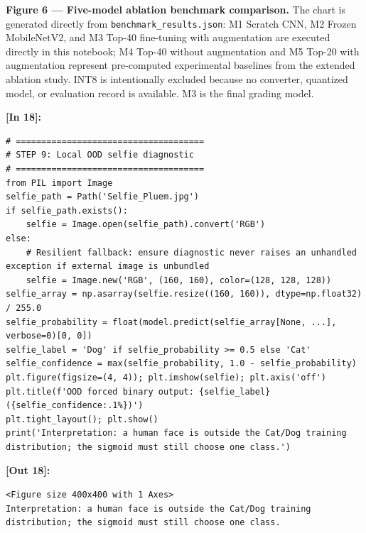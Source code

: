 \vspace{-0.3em}
\begin{tcolorbox}[colback=gray!5!white,colframe=gray!50!black,boxrule=0.5pt,arc=2pt,left=6pt,right=6pt,halign=left,before upper={\sloppy\raggedright},top=4pt,bottom=4pt,unbreakable]
\textbf{Figure 6 — Five-model ablation benchmark comparison.} The chart is generated directly from \texttt{benchmark\_results.json}: M1 Scratch CNN, M2 Frozen MobileNetV2, and M3 Top-40 fine-tuning with augmentation are executed directly in this notebook; M4 Top-40 without augmentation and M5 Top-20 with augmentation represent pre-computed experimental baselines from the extended ablation study. INT8 is intentionally excluded because no converter, quantized model, or evaluation record is available. M3 is the final grading model.
\end{tcolorbox}

\vspace{0.6em}
\noindent\textbf{\small [In 18]:}
\begin{lstlisting}[style=pycode]
# =====================================
# STEP 9: Local OOD selfie diagnostic
# =====================================
from PIL import Image
selfie_path = Path('Selfie_Pluem.jpg')
if selfie_path.exists():
    selfie = Image.open(selfie_path).convert('RGB')
else:
    # Resilient fallback: ensure diagnostic never raises an unhandled exception if external image is unbundled
    selfie = Image.new('RGB', (160, 160), color=(128, 128, 128))
selfie_array = np.asarray(selfie.resize((160, 160)), dtype=np.float32) / 255.0
selfie_probability = float(model.predict(selfie_array[None, ...], verbose=0)[0, 0])
selfie_label = 'Dog' if selfie_probability >= 0.5 else 'Cat'
selfie_confidence = max(selfie_probability, 1.0 - selfie_probability)
plt.figure(figsize=(4, 4)); plt.imshow(selfie); plt.axis('off')
plt.title(f'OOD forced binary output: {selfie_label} ({selfie_confidence:.1%})')
plt.tight_layout(); plt.show()
print('Interpretation: a human face is outside the Cat/Dog training distribution; the sigmoid must still choose one class.')\end{lstlisting}
\noindent\textbf{\small [Out 18]:}
\begin{lstlisting}[style=output]
<Figure size 400x400 with 1 Axes>
Interpretation: a human face is outside the Cat/Dog training distribution; the sigmoid must still choose one class.
\end{lstlisting}

